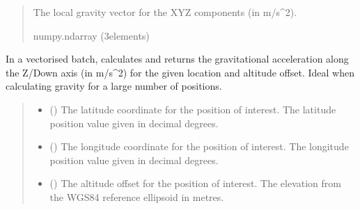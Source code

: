 \documentclass[letterpaper,10pt,english]{sphinxmanual}
\begin{document}
\begin{fulllineitems}
\begin{fulllineitems}
\begin{quote}
\begin{description}
\begin{itemize}
\end{itemize}

\sphinxAtStartPar
The local gravity vector for the XYZ components (in m/s\textasciicircum{}2).

\sphinxAtStartPar
numpy.ndarray (3\sphinxhyphen{}elements)

\end{description}\end{quote}

\end{fulllineitems}


\begin{fulllineitems}
\label{\detokenize{modules/gravity/somigliana:qnav.gravity.somigliana.Somigliana.calc_gravity_z_vec}}
\pysigstartsignatures
{}
\pysigstopsignatures
\sphinxAtStartPar
In a vectorised batch, calculates and returns the gravitational
acceleration along the Z/Down axis (in m/s\textasciicircum{}2) for the given location
and altitude offset. Ideal when calculating gravity for a large
number of positions.
\begin{quote}\begin{description}
\begin{itemize}
\item {} 
\sphinxAtStartPar
{} () \textendash{} The latitude coordinate for the position of interest.
The latitude position value given in decimal degrees.

\item {} 
\sphinxAtStartPar
{} () \textendash{} The longitude coordinate for the position of interest.
The longitude position value given in decimal degrees.

\item {} 
\sphinxAtStartPar
{} () \textendash{} The altitude offset for the position of interest.
The elevation from the WGS\sphinxhyphen{}84 reference ellipsoid in metres.


\end{itemize}
\end{description}
\end{quote}
\end{fulllineitems}
\end{fulllineitems}
\end{document}
